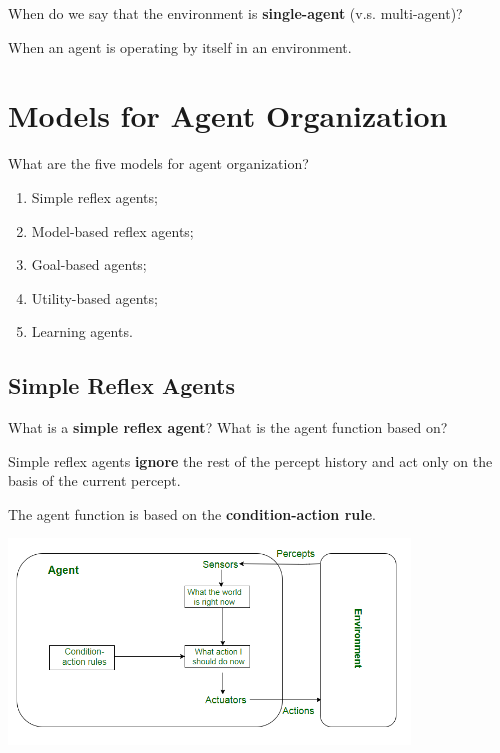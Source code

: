 \begin{cstqsn*}
When do we say that the environment is \textbf{single-agent} (v.s. multi-agent)?
\end{cstqsn*}

When an agent is operating by itself in an environment.

\section{Models for Agent Organization}

\begin{cstqsn*}
What are the five models for agent organization?
\end{cstqsn*}

\begin{enumerate}
  \item Simple reflex agents;
  \item Model-based reflex agents;
  \item Goal-based agents;
  \item Utility-based agents;
  \item Learning agents.
\end{enumerate}

\subsection{Simple Reflex Agents}

\begin{cstqsn*}
What is a \textbf{simple reflex agent}? What is the agent function based on?
\end{cstqsn*}

Simple reflex agents \textbf{ignore} the rest of the percept history and act 
only on the basis of the current percept. 

The agent function is based on the \textbf{condition-action rule}.

\begin{center}
\includegraphics[width=0.8\textwidth]{images/lec01/simple_reflex_agent.png} 
\end{center}

